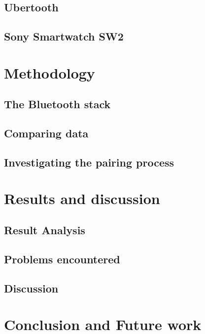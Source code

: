 \documentclass{article}
\begin{document}
	\subsection{Ubertooth}
	\subsection{Sony Smartwatch SW2} %
	
\newpage
\section{Methodology}		%
 
	\subsection{The Bluetooth stack}
				
		
	\subsection{Comparing data}	%
		
	
	\subsection{Investigating the pairing process}
		
\newpage
\section{Results and discussion}

		\subsection{Result Analysis}
		
		\subsection{Problems encountered}
		
		\subsection{Discussion}
		
\newpage
\section{Conclusion and Future work}



\vspace*{2\baselineskip} %


{}

\end{document}
